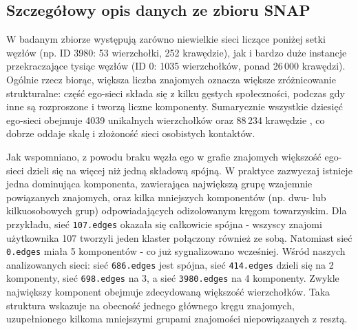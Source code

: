 

\subsection{Szczegółowy opis danych ze zbioru SNAP}
W badanym zbiorze występują zarówno niewielkie sieci liczące poniżej setki węzłów (np. ID 3980: 53 wierzchołki, 252 krawędzie), jak i bardzo duże instancje przekraczające tysiąc węzłów (ID 0: 1035 wierzchołków, ponad 26\,000 krawędzi). Ogólnie rzecz biorąc, większa liczba znajomych oznacza większe zróżnicowanie strukturalne: część ego-sieci składa się z kilku gęstych społeczności, podczas gdy inne są rozproszone i tworzą liczne komponenty. Sumarycznie wszystkie dziesięć ego-sieci obejmuje 4039 unikalnych wierzchołków oraz 88\,234 krawędzie \cite{McAuley2012}, co dobrze oddaje skalę i złożoność sieci osobistych kontaktów.

Jak wspomniano, z powodu braku węzła ego w grafie znajomych większość ego-sieci dzieli się na więcej niż jedną składową spójną. W praktyce zazwyczaj istnieje jedna dominująca komponenta, zawierająca największą grupę wzajemnie powiązanych znajomych, oraz kilka mniejszych komponentów (np. dwu- lub kilkuosobowych grup) odpowiadających odizolowanym kręgom towarzyskim. Dla przykładu, sieć \verb|107.edges| okazała się całkowicie spójna - wszyscy znajomi użytkownika 107 tworzyli jeden klaster połączony również ze sobą. Natomiast sieć \verb|0.edges| miała 5 komponentów - co już sygnalizowano wcześniej. Wśród naszych analizowanych sieci: sieć \verb|686.edges| jest spójna, sieć \verb|414.edges| dzieli się na 2 komponenty, sieć \verb|698.edges| na 3, a sieć \verb|3980.edges| na 4 komponenty. Zwykle największy komponent obejmuje zdecydowaną większość wierzchołków. Taka struktura wskazuje na obecność jednego głównego kręgu znajomych, uzupełnionego kilkoma mniejszymi grupami znajomości niepowiązanych z resztą.

